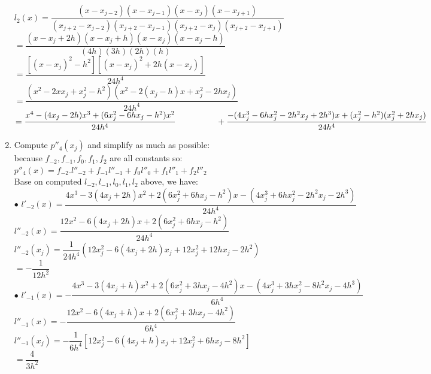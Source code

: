 \documentclass[14pt,a4paper]{article}
\begin{document}
\begin{enumerate}
	$l_2(x) = \dfrac{(x-x_{j-2})(x-x_{j-1})(x-x_j)(x-x_{j+1})}{(x_{j+2}-x_{j-2})(x_{j+2}-x_{j-1})(x_{j+2}-x_j)(x_{j+2}-x_{j+1})} $\\
	\hspace*{0.8cm} $= \dfrac{(x-x_j +2h)(x-x_j+h)(x-x_j)(x-x_j-h)}{(4h)(3h)(2h)(h)}$\\
	\hspace*{0.8cm} $= \dfrac{[(x-x_j)^2 -h^2][(x-x_j)^2 +2h(x-x_j)]}{24h^4} $\\
	\hspace*{0.8cm} $= \dfrac{(x^2 - 2xx_j + x_j^2 -h^2)(x^2 - 2(x_j-h)x +x_j^2 -2hx_j)}{24h^4}$\\
	\hspace*{0.8cm}	$= \dfrac{x^4 - (4x_j-2h)x^3 +(6x_j^2 - 6hx_j -h^2)x^2 }{24h^4} \\
	\hspace*{1.7cm} + \dfrac{- (4x_j^3 -6hx_j^2 -2h^2x_j +2h^3)x + (x_j^2-h^2)(x_j^2+2hx_j)}{24h^4}$
	\pagebreak
	
	\label{1b}
	\item Compute $p''_4(x_j)$ and simplify as much as possible:\\
	because $f_{-2}, f_{-1},f_0,f_1,f_2$ are all constants so: \\
	\hspace*{3cm} $p''_4(x) = f_{-2}.l''_{-2} + f_{-1}l''_{-1} + f_0l''_0 +f_1l''_1 + f_2l''_2$\\
	Base on computed $l_{-2}, l_{-1},l_0,l_1,l_2$ above, we have:\\
	$\bullet$ $ l'_{-2}(x) = \dfrac{4x^3- 3(4x_j+2h)x^2 + 2(6x_j^2+6hx_j-h^2)x -(4x_j^3+6hx_j^2-2h^2x_j -2h^3)}{24h^4}$\\
	\hspace*{0.2cm} $l''_{-2}(x) = \dfrac{12x^2 - 6(4x_j+2h)x+2(6x_j^2+6hx_j-h^2)}{24h^4}$\\
	\hspace*{0.2cm} $l''_{-2}(x_j) = \dfrac{1}{24h^4} (12x_j^2 -6(4x_j+2h)x_j + 12x_j^2 + 12hx_j -2h^2)$\\
	\hspace*{1.6cm} $ = -\dfrac{1}{12h^2}$\\
	
	$\bullet$ $ l'_{-1}(x) = - \dfrac{4x^3 -3(4x_j+h)x^2 + 2(6x_j^2 +3hx_j -4h^2)x -(4x_j^3 +3hx_j^2 -8h^2x_j -4h^3)}{6h^4} $\\
	\hspace*{0.2cm} $l''_{-1}(x) = - \dfrac{12x^2 -6(4x_j+h)x +2(6x_j^2 + 3hx_j -4h^2)}{6h^4}$\\
	\hspace*{0.2cm} $l''_{-1}(x_j) = -\dfrac{1}{6h^4} [12x_j^2 -6(4x_j+h)x_j + 12x_j^2 +6hx_j -8h^2]$\\
	\hspace*{1.6cm} $ = \dfrac{4}{3h^2}$\\
	

\end{enumerate}
\end{document}
